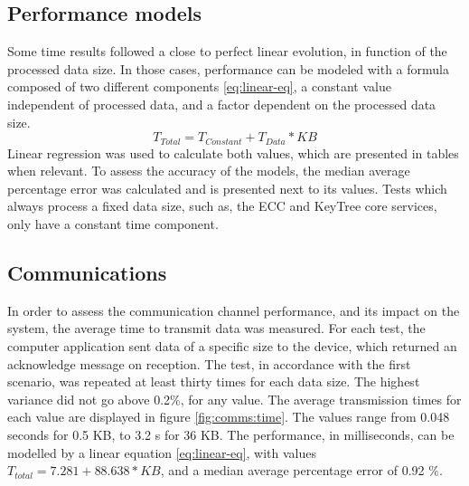 \subsection{Performance models}\label{chap:evaluation:performance:models}

Some time results followed a close to perfect linear evolution, in function of the processed data size. In those cases, performance can be modeled with a formula composed of two different components \ref{eq:linear-eq}, a constant value independent of processed data, and a factor dependent on the processed data size.
\begin{equation}
	\label{eq:linear-eq}
	T_{Total} = T_{Constant} + T_{Data} * KB
\end{equation}
Linear regression was used to calculate both values, which are presented in tables when relevant. To assess the accuracy of the models, the median average percentage error was calculated and is presented next to its values. Tests which always process a fixed data size, such as, the ECC and KeyTree core services, only have a constant time component.

\subsection{Communications}\label{chap:evaluation:performance:comms}

In order to assess the communication channel performance, and its impact on the system, the average time to transmit data was measured. For each test, the computer application sent data of a specific size to the device, which returned an acknowledge message on reception. The test, in accordance with the first scenario, was repeated at least thirty times for each data size. The highest variance did not go above 0.2\%, for any value.
The average transmission times for each value are displayed in figure \ref{fig:comms:time}.
The values range from 0.048 seconds for 0.5 KB, to 3.2 s for 36 KB.
The performance, in milliseconds, can be modelled by a linear equation \ref{eq:linear-eq}, with values \(T_{total} = 7.281 + 88.638 * KB\), and a median average percentage error of 0.92 \%.

